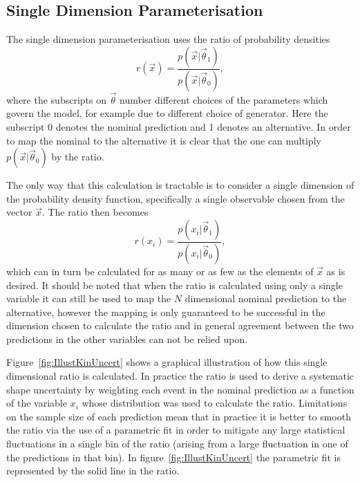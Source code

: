 \subsection{Single Dimension Parameterisation}
\label{sec:1D-reweight}

The single dimension parameterisation uses the ratio of probability densities
\begin{equation}
  r(\vec{x}) = \frac{p(\vec{x}|\vec{\theta}_{1})}{p(\vec{x}|\vec{\theta}_{0})},
  \label{eq:DensityRatio}
\end{equation}
where the subscripts on $\vec{\theta}$ number different choices of the
parameters which govern the model, for example due to different choice of
generator. Here the subscript 0 denotes the nominal prediction and 1 denotes an
alternative. In order to map the nominal to the alternative it is clear that the
one can multiply $p(\vec{x}|\vec{\theta}_{0})$ by the ratio.

The only way that this calculation is tractable is to consider a single
dimension of the probability density function, specifically a single observable
chosen from the vector $\vec{x}$. The ratio then becomes
\begin{equation}
  r(x_{i}) = \frac{p(x_{i}|\vec{\theta}_{1})}{p(x_{i}|\vec{\theta}_{0})},
  \label{eq:1D-ratio}
\end{equation}
which can in turn be calculated for as many or as few as the elements of
$\vec{x}$ as is desired. It should be noted that when the ratio is calculated
using only a single variable it can still be used to map the $N$ dimensional
nominal prediction to the alternative, however the mapping is only guaranteed to
be successful in the dimension chosen to calculate the ratio and in general
agreement between the two predictions in the other variables can not be relied
upon.

Figure~\ref{fig:IllustKinUncert} shows a graphical illustration of how this
single dimensional ratio is calculated. In practice the ratio is used to derive
a systematic shape uncertainty by weighting each event in the nominal
prediction as a function of the variable $x_{i}$ whose distribution was used to
calculate the ratio. Limitations on the sample size of each prediction mean that
in practice it is better to smooth the ratio via the use of a parametric fit in
order to mitigate any large statistical fluctuations in a single bin of the
ratio (arising from a large fluctuation in one of the predictions in that bin).
In figure~\ref{fig:IllustKinUncert} the parametric fit is represented by the
solid line in the ratio.


